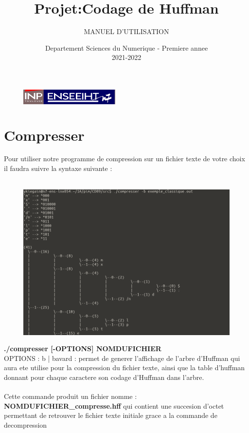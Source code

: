 \documentclass[frenchb]{article}
\begin{document}
\begin{figure}[t]
\centering
\includegraphics[width=5cm]{inp_n7.png}
\end{figure}

\title{\vspace{4cm} \textbf{Projet:Codage de Huffman}}
\author{MANUEL D'UTILISATION}
\date{\vspace{7cm} Departement Sciences du Numerique - Premiere annee \\
2021-2022 }

\maketitle

\newpage
\section{Compresser}
\Large Pour utiliser notre programme de compression sur un fichier texte de votre choix il faudra suivre la syntaxe suivante :\\\\

\begin{figure}[ht!]
    				\centering
                \includegraphics[scale=0.4]{tableabrhuffman.png} 
				\end{figure}

\textbf{./compresser [-OPTIONS] NOMDUFICHIER}\\
OPTIONS : b | bavard :  permet de generer l'affichage de l'arbre d'Huffman qui aura ete utilise pour la compression du fichier texte, ainsi que la table d'huffman donnant pour chaque caractere son codage d'Huffman dans l'arbre. \\\\
Cette commande produit un fichier nomme :\\ \textbf{NOMDUFICHIER\_compresse.hff} qui contient une succesion d'octet permettant de retrouver le fichier texte initiale grace a la commande de decompression\\
\end{document}
